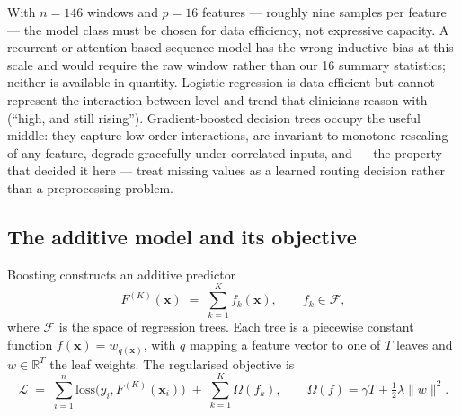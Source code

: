 \documentclass[11pt,a4paper]{article}
\newcommand{\R}{\mathbb{R}}
\begin{document}
With $n=146$ windows and $p=16$ features --- roughly nine samples per feature ---
the model class must be chosen for data efficiency, not expressive capacity. A
recurrent or attention-based sequence model has the wrong inductive bias at this
scale and would require the raw window rather than our 16 summary statistics;
neither is available in quantity. Logistic regression is data-efficient but cannot
represent the interaction between level and trend that clinicians reason with
(``high, and still rising''). Gradient-boosted decision trees occupy the useful
middle: they capture low-order interactions, are invariant to monotone rescaling of
any feature, degrade gracefully under correlated inputs, and --- the property that
decided it here --- treat missing values as a learned routing decision rather than
a preprocessing problem.

\subsection{The additive model and its objective}

Boosting constructs an additive predictor
\begin{equation}
  F^{(K)}(\mathbf{x}) \;=\; \sum_{k=1}^{K} f_k(\mathbf{x}),
  \qquad f_k \in \mathcal{F},
\end{equation}
where $\mathcal{F}$ is the space of regression trees. Each tree is a piecewise
constant function $f(\mathbf{x}) = w_{q(\mathbf{x})}$, with $q$ mapping a feature
vector to one of $T$ leaves and $w\in\R^T$ the leaf weights. The regularised
objective is
\begin{equation}
\label{eq:obj}
  \mathcal{L} \;=\; \sum_{i=1}^{n} \mathrm{loss}\bigl(y_i, F^{(K)}(\mathbf{x}_i)\bigr)
     \;+\; \sum_{k=1}^{K}\Omega(f_k),
  \qquad
  \Omega(f) = \gamma T + \tfrac{1}{2}\lambda\|w\|^2 .
\end{equation}
\end{document}
